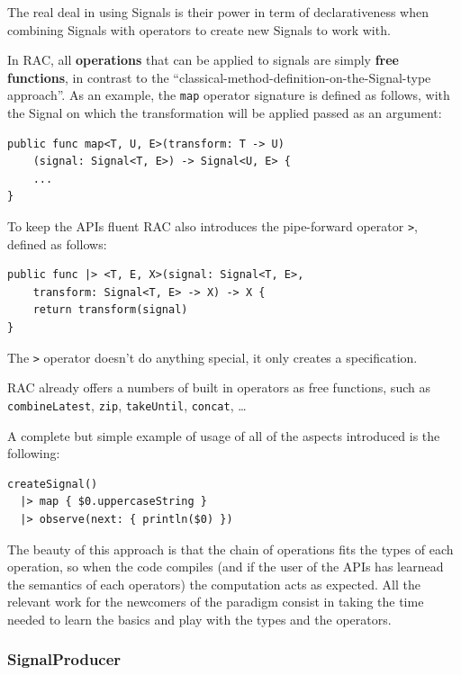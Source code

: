 The real deal in using Signals is their power in term of declarativeness
when combining Signals with operators to create new Signals to work
with.

In RAC, all \textbf{operations} that can be applied to signals are
simply \textbf{free functions}, in contrast to the
``classical-method-definition-on-the-Signal-type approach''. As an
example, the \texttt{map} operator signature is defined as follows, with
the Signal on which the transformation will be applied passed as an
argument:

\begin{verbatim}
public func map<T, U, E>(transform: T -> U)
    (signal: Signal<T, E>) -> Signal<U, E> {
    ...
}
\end{verbatim}

To keep the APIs fluent RAC also introduces the pipe-forward operator
\texttt{\textbar{}\textgreater{}}, defined as follows:

\begin{verbatim}
public func |> <T, E, X>(signal: Signal<T, E>,
    transform: Signal<T, E> -> X) -> X {
    return transform(signal)
}
\end{verbatim}

The \texttt{\textbar{}\textgreater{}} operator doesn't do anything
special, it only creates a specification.

RAC already offers a numbers of built in operators as free functions,
such as \texttt{combineLatest}, \texttt{zip}, \texttt{takeUntil},
\texttt{concat}, \ldots{}

A complete but simple example of usage of all of the aspects introduced
is the following:

\begin{verbatim}
createSignal()
  |> map { $0.uppercaseString }
  |> observe(next: { println($0) })
\end{verbatim}

The beauty of this approach is that the chain of operations fits the
types of each operation, so when the code compiles (and if the user of
the APIs has learnead the semantics of each operators) the computation
acts as expected. All the relevant work for the newcomers of the
paradigm consist in taking the time needed to learn the basics and play
with the types and the operators.

\subsubsection{SignalProducer}\label{signalproducer}

